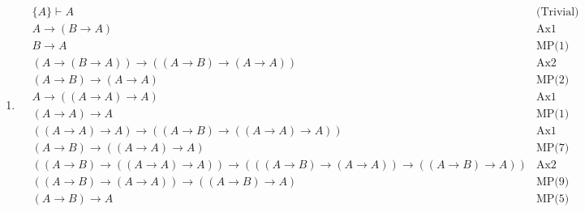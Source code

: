 
\begin{enumerate}
	\item 
		\begin{align}
		    & \{A\} \vdash A & \text{(Trivial)} \\
			& A \to (B \to A) & \text{Ax1} \\
			& B \to A & \text{MP(1)(2)} \\
			& (A\to(B\to A)) \to ((A \to B) \to (A \to A)) & \text{Ax2} \\
			& (A \to B) \to (A \to A) & \text{MP(2)(4)} \\
			& A \to ((A\to A) \to A) & \text{Ax1} \\
			& (A\to A) \to A & \text{MP(1)(6)} \\
			& ((A \to A)\to A) \to ((A \to B) \to ((A \to A)\to A)) & \text{Ax1} \\
			& (A \to B) \to ((A \to A)\to A) & \text{MP(7)(8)} \\
			& ((A \to B)\to((A \to A) \to A)) \to (((A \to B) \to (A \to A)) \to ((A \to B) \to A)) & \text{Ax2} \\
			& ((A \to B) \to (A \to A)) \to ((A \to B) \to A) & \text{MP(9)(10)} \\
			& (A \to B) \to A & \text{MP(5)(11)}
		\end{align}
	
\end{enumerate}



\smiley

